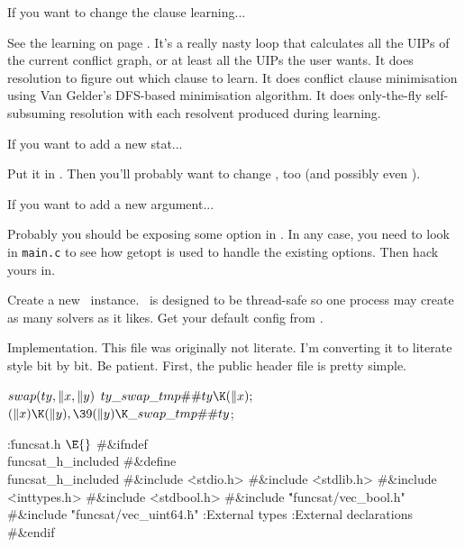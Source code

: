 If you want to change the clause learning...

See the learning on page . It's a really nasty loop that
calculates all the UIPs of the current conflict graph, or at least all the UIPs
the user wants. It does resolution to figure out which clause to learn. It does
conflict clause minimisation using Van Gelder's DFS-based minimisation
algorithm. It does only-the-fly self-subsuming resolution with each resolvent
produced during learning.

\fi

If you want to add a new stat...

Put it in . Then you'll probably want to change ,
too (and possibly even ).

\fi

If you want to add a new argument...

Probably you should be exposing some option in .
In any case, you
need to look in {\tt main.c} to see how getopt is used to handle the existing
options. Then hack yours in.


Create a new \funcsat\ instance.  \funcsat\ is designed to be thread-safe so
one
process may create as many solvers as it likes. Get your default config from
.

\fi

Implementation. This file was originally not literate. I'm converting
it to
literate style bit by bit. Be patient. First, the public header file is pretty
simple.

\Y\B\4\D$\\{swap}(\\{ty},\|x,\|y)$ \5
$\\{ty}\\{\_swap\_tmp}\#{\#}\\{ty}\K(\|x);{}$\6
${}(\|x)\K(\|y),\39(\|y)\K\\{\_swap\_tmp}\#{\#}\\{ty}{}$;\par
\Y\B\4:\.{funcsat.h }\X${}\E{}$\6
\8\#\&{ifndef} \\{funcsat\_h\_included}\6
\8\#\&{define} \\{funcsat\_h\_included}\6
\8\#\&{include} \.{<stdio.h>}\6
\8\#\&{include} \.{<stdlib.h>}\6
\8\#\&{include} \.{<inttypes.h>}\6
\8\#\&{include} \.{<stdbool.h>}\6
\8\#\&{include} \.{"funcsat/vec\_bool.h"}\6
\8\#\&{include} \.{"funcsat/vec\_uint64.}\)\.{h"}\6
:External types\X\6
:External declarations\X\6
\8\#\&{endif}\par
\fi

